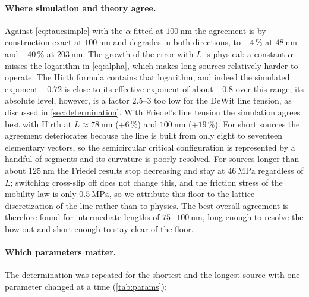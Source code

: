 \documentclass[11pt,a4paper]{article}
\numberwithin{equation}{section}
\theoremstyle{remark}
\begin{document}
\paragraph{Where simulation and theory agree.}
Against \cref{eq:taucsimple} with the $\alpha$ fitted at $\SI{100}{\nano\metre}$ the agreement is by
construction exact at $\SI{100}{\nano\metre}$ and degrades in both directions, to $-4\,\%$ at
$\SI{48}{\nano\metre}$ and $+40\,\%$ at $\SI{203}{\nano\metre}$. The growth of the error with $L$ is
physical: a constant $\alpha$ misses the logarithm in \cref{eq:alpha}, which makes long sources
relatively harder to operate. The Hirth formula contains that logarithm, and indeed the simulated
exponent $-0.72$ is close to its effective exponent of about $-0.8$ over this range; its absolute level,
however, is a factor $2.5$--$3$ too low for the DeWit line tension, as discussed in \cref{sec:determination}.
With Friedel's line tension the simulation agrees best with Hirth at $L \approx \SI{78}{\nano\metre}$
($+6\,\%$) and $\SI{100}{\nano\metre}$ ($+19\,\%$). For short sources the agreement deteriorates because
the line is built from only eight to seventeen elementary vectors, so the semicircular critical
configuration is represented by a handful of segments and its curvature is poorly resolved. For sources
longer than about $\SI{125}{\nano\metre}$ the Friedel results stop decreasing and stay at
$\SI{46}{\mega\pascal}$ regardless of $L$; switching cross-slip off does not change this, and the friction
stress of the mobility law is only $\SI{0.5}{\mega\pascal}$, so we attribute this floor to the lattice
discretization of the line rather than to physics. The best overall agreement is therefore found for
intermediate lengths of $\SI{75}{}$--$\SI{100}{\nano\metre}$, long enough to resolve the bow-out and
short enough to stay clear of the floor.

\paragraph{Which parameters matter.}
The determination was repeated for the shortest and the longest source with one parameter changed at
a time (\cref{tab:params}):
\end{document}

